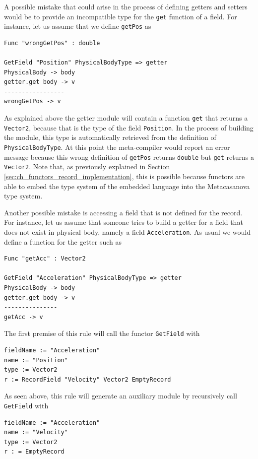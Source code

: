 A possible mistake that could arise in the process of defining getters and setters would be to provide an incompatible type for the \texttt{get} function of a field. For instance, let us assume that we define \texttt{getPos} as

\begin{lstlisting}
Func "wrongGetPos" : double

GetField "Position" PhysicalBodyType => getter
PhysicalBody -> body
getter.get body -> v
-----------------
wrongGetPos -> v
\end{lstlisting}

\noindent
As explained above the getter module will contain a function \texttt{get} that returns a \texttt{Vector2}, because that is the type of the field \texttt{Position}. In the process of building the module, this type is automatically retrieved from the definition of \texttt{PhysicalBodyType}. At this point the meta-compiler would report an error message because this wrong definition of \texttt{getPos} returns \texttt{double} but \texttt{get} returns a \texttt{Vector2}. Note that, as previously explained in Section \ref{sec:ch_functors_record_implementation}, this is possible because functors are able to embed the type system of the embedded language into the Metacasanova type system.


Another possible mistake is accessing a field that is not defined for the record. For instance, let us assume that someone tries to build a getter for a field that does not exist in physical body, namely a field \texttt{Acceleration}. As usual we would define a function for the getter such as

\begin{lstlisting}
Func "getAcc" : Vector2

GetField "Acceleration" PhysicalBodyType => getter
PhysicalBody -> body
getter.get body -> v
---------------
getAcc -> v
\end{lstlisting}

\noindent
The first premise of this rule will call the functor \texttt{GetField} with

\begin{lstlisting}
fieldName := "Acceleration"
name := "Position"
type := Vector2
r := RecordField "Velocity" Vector2 EmptyRecord
\end{lstlisting}

\noindent
As seen above, this rule will generate an auxiliary module by recursively call \texttt{GetField} with

\begin{lstlisting}
fieldName := "Acceleration"
name := "Velocity"
type := Vector2
r : = EmptyRecord
\end{lstlisting}

